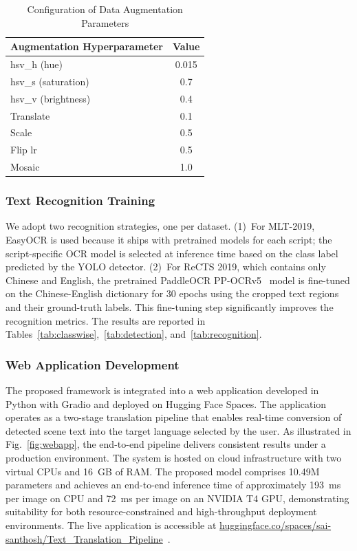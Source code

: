 \documentclass{ieeeaccess}
\begin{document}
\begin{table}[htbp]
\caption{Configuration of Data Augmentation Parameters}
\label{tab:aug}
\begin{center}
\begin{tabular}{|l|c|}
\hline
\textbf{Augmentation Hyperparameter} & \textbf{Value} \\
\hline
hsv\_h (hue) & 0.015 \\
hsv\_s (saturation) & 0.7 \\
hsv\_v (brightness) & 0.4 \\
Translate & 0.1 \\
Scale & 0.5 \\
Flip lr & 0.5 \\
Mosaic & 1.0 \\
\hline
\end{tabular}
\end{center}
\end{table}

\subsubsection{Text Recognition Training}

We adopt two recognition strategies, one per dataset. (1)~For MLT-2019, EasyOCR is used because it ships with pretrained models for each script; the script-specific OCR model is selected at inference time based on the class label predicted by the YOLO detector. (2)~For ReCTS 2019, which contains only Chinese and English, the pretrained PaddleOCR PP-OCRv5~\cite{b37} model is fine-tuned on the Chinese-English dictionary for 30 epochs using the cropped text regions and their ground-truth labels. This fine-tuning step significantly improves the recognition metrics. The results are reported in Tables~\ref{tab:classwise},~\ref{tab:detection}, and~\ref{tab:recognition}.

\subsubsection{Web Application Development}

The proposed framework is integrated into a web application developed in Python with Gradio and deployed on Hugging Face Spaces. The application operates as a two-stage translation pipeline that enables real-time conversion of detected scene text into the target language selected by the user. As illustrated in Fig.~\ref{fig:webapp}, the end-to-end pipeline delivers consistent results under a production environment. The system is hosted on cloud infrastructure with two virtual CPUs and 16~GB of RAM. The proposed model comprises 10.49M parameters and achieves an end-to-end inference time of approximately 193~ms per image on CPU and 72~ms per image on an NVIDIA T4 GPU, demonstrating suitability for both resource-constrained and high-throughput deployment environments. The live application is accessible at
\href{https://huggingface.co/spaces/sai-santhosh/Text_Translation_Pipeline}{huggingface.co/spaces/sai-santhosh/Text\_Translation\_Pipeline}~\cite{b38}.
\end{document}
